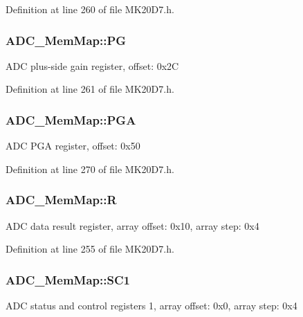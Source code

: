 Definition at line 260 of file M\+K20\+D7.\+h.

\subsubsection[{\texorpdfstring{PG}{PG}}]{ A\+D\+C\+\_\+\+Mem\+Map\+::\+PG}\hypertarget{struct_a_d_c___mem_map_aa63b6cd61d17dda7d69bdc02c7f5204a}{}\label{struct_a_d_c___mem_map_aa63b6cd61d17dda7d69bdc02c7f5204a}
A\+DC plus-\/side gain register, offset\+: 0x2C 

Definition at line 261 of file M\+K20\+D7.\+h.

\subsubsection[{\texorpdfstring{P\+GA}{PGA}}]{ A\+D\+C\+\_\+\+Mem\+Map\+::\+P\+GA}\hypertarget{struct_a_d_c___mem_map_a3c43d657acb03daee1a6abbb58206a56}{}\label{struct_a_d_c___mem_map_a3c43d657acb03daee1a6abbb58206a56}
A\+DC P\+GA register, offset\+: 0x50 

Definition at line 270 of file M\+K20\+D7.\+h.

\subsubsection[{\texorpdfstring{R}{R}}]{ A\+D\+C\+\_\+\+Mem\+Map\+::R}\hypertarget{struct_a_d_c___mem_map_adc5637a6af56fc44650bf216491659fc}{}\label{struct_a_d_c___mem_map_adc5637a6af56fc44650bf216491659fc}
A\+DC data result register, array offset\+: 0x10, array step\+: 0x4 

Definition at line 255 of file M\+K20\+D7.\+h.

\subsubsection[{\texorpdfstring{S\+C1}{SC1}}]{ A\+D\+C\+\_\+\+Mem\+Map\+::\+S\+C1}\hypertarget{struct_a_d_c___mem_map_a9d2909674291dea7de54b9e641c2a51c}{}\label{struct_a_d_c___mem_map_a9d2909674291dea7de54b9e641c2a51c}
A\+DC status and control registers 1, array offset\+: 0x0, array step\+: 0x4 

